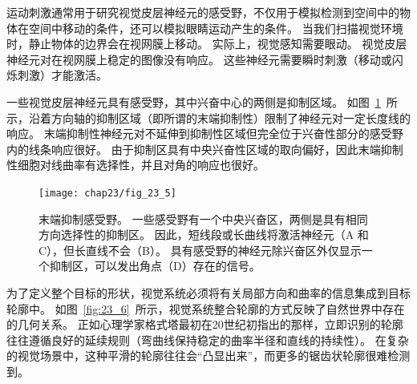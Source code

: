 运动刺激通常用于研究视觉皮层神经元的感受野，不仅用于模拟检测到空间中的物体在空间中移动的条件，还可以模拟眼睛运动产生的条件。
当我们扫描视觉环境时，静止物体的边界会在视网膜上移动。
实际上，视觉感知需要眼动。
视觉皮层神经元对在视网膜上稳定的图像没有响应。
这些神经元需要瞬时刺激（移动或闪烁刺激）才能激活。


一些视觉皮层神经元具有感受野，其中兴奋中心的两侧是抑制区域。
如图~\ref{fig:23_5}~所示，沿着方向轴的抑制区域（即所谓的末端抑制性）限制了神经元对一定长度线的响应。
末端抑制性神经元对不延伸到抑制性区域但完全位于兴奋性部分的感受野内的线条响应很好。
由于抑制区具有中央兴奋性区域的取向偏好，因此末端抑制性细胞对线曲率有选择性，并且对角的响应也很好。


\begin{figure}[htbp]
	\centering
	\texttt{[image: chap23/fig\_23\_5]}
	\caption{末端抑制感受野。
		一些感受野有一个中央兴奋区，两侧是具有相同方向选择性的抑制区。
		因此，短线段或长曲线将激活神经元（A 和 C），但长直线不会（B）。
		具有感受野的神经元除兴奋区外仅显示一个抑制区，可以发出角点（D）存在的信号。}
	\label{fig:23_5}
\end{figure}


为了定义整个目标的形状，视觉系统必须将有关局部方向和曲率的信息集成到目标轮廓中。
如图~\ref{fig:23_6}~所示，视觉系统整合轮廓的方式反映了自然世界中存在的几何关系。
正如心理学家格式塔最初在20世纪初指出的那样，立即识别的轮廓往往遵循良好的延续规则（弯曲线保持稳定的曲率半径和直线的持续性）。
在复杂的视觉场景中，这种平滑的轮廓往往会“凸显出来”，而更多的锯齿状轮廓很难检测到。


